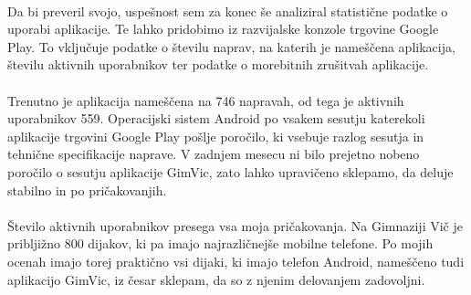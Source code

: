 \paragraph{}Da bi preveril svojo, uspešnost sem za konec še analiziral statistične podatke o uporabi aplikacije. Te lahko pridobimo iz razvijalske konzole trgovine Google Play. To vključuje podatke o številu naprav, na katerih je nameščena aplikacija, številu aktivnih uporabnikov ter podatke o morebitnih zrušitvah aplikacije.

\paragraph{}Trenutno je aplikacija nameščena na 746 napravah, od tega je aktivnih uporabnikov 559. Operacijski sistem Android po vsakem sesutju katerekoli aplikacije trgovini Google Play pošlje poročilo, ki vsebuje razlog sesutja in tehnične specifikacije naprave. V zadnjem mesecu ni bilo prejetno nobeno poročilo o sesutju aplikacije GimVic, zato lahko upravičeno sklepamo, da deluje stabilno in po pričakovanjih.

\paragraph{}Število aktivnih uporabnikov presega vsa moja pričakovanja. Na Gimnaziji Vič je pribljižno 800 dijakov, ki pa imajo najrazličnejše mobilne telefone. Po mojih ocenah imajo torej praktično vsi dijaki, ki imajo telefon Android, nameščeno tudi aplikacijo GimVic, iz česar sklepam, da so z njenim delovanjem zadovoljni.
